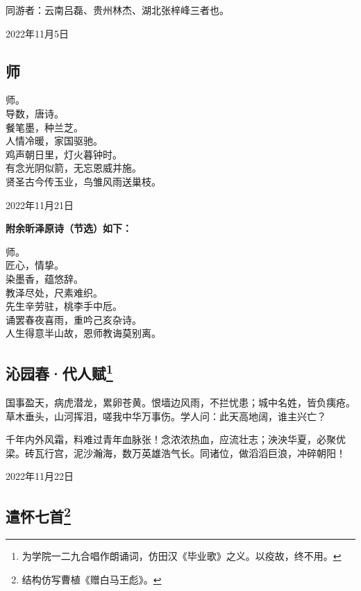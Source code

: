 \documentclass[a5paper]{ctexart}
\begin{document}
	同游者：云南吕磊、贵州林杰、湖北张梓峰三者也。
	\begin{flushright}
		2022年11月5日
	\end{flushright}
	
	\subsection{师}
	\begin{center}
		师。\\
		导数，唐诗。\\
		餐笔墨，种兰芝。\\
		人情冷暖，家国驱驰。\\
		鸡声朝日里，灯火暮钟时。\\
		有念光阴似箭，无忘恩威并施。\\
		贤圣古今传玉业，鸟雏风雨送巢枝。
		
	\end{center}
	\hfill 2022年11月21日
	\begin{flushleft}
		\textbf{附余昕泽原诗（节选）如下：}
	\end{flushleft}
	\begin{center}
		师。\\
		匠心，情挚。\\
		染墨香，蕴悠辞。\\
		教泽尽处，尺素难织。\\
		先生辛劳驻，桃李手中卮。\\
		诵罢春夜喜雨，重吟己亥杂诗。\\
		人生得意半山故，恩师教诲莫别离。
	\end{center}
	
	\subsection[沁园春·代人赋]{沁园春·代人赋\footnote{为学院一二九合唱作朗诵词，仿田汉《毕业歌》之义。以疫故，终不用。}}
	国事盈天，病虎潜龙，累卵苍黄。恨墙边风雨，不拦忧患；城中名姓，皆负痍疮。草木垂头，山河挥泪，嗟我中华万事伤。学人问：此天高地阔，谁主兴亡？
	
	千年内外风霜，料难过青年血脉张！念浓浓热血，应流壮志；泱泱华夏，必聚优梁。砖瓦行宫，泥沙瀚海，数万英雄浩气长。同诸位，做滔滔巨浪，冲碎朝阳！
	\begin{flushright}
		2022年11月22日
	\end{flushright}

	
	
	\subsection[遣怀七首]{遣怀七首\footnote{结构仿写曹植《赠白马王彪》。}}
\end{document}

